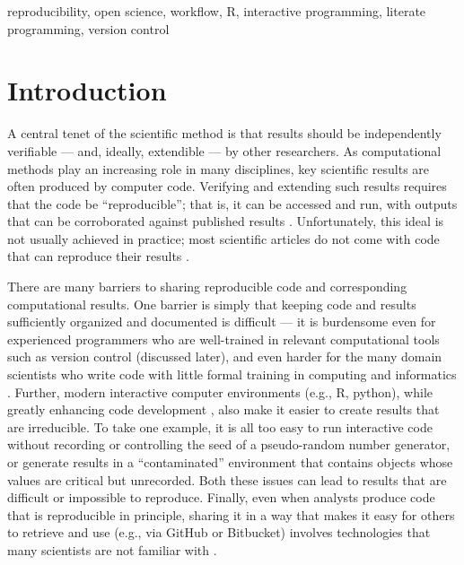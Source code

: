 \documentclass[9pt,a4paper]{extarticle}
\begin{document}
reproducibility, open science, workflow, R, interactive programming,
literate programming, version control

\clearpage

\pagestyle{main}


\section*{Introduction}

A central tenet of the scientific method is that results should be
independently verifiable --- and, ideally, extendible --- by other
researchers. As computational methods play an increasing role in many
disciplines, key scientific results are often produced by computer code.
Verifying and extending such results requires that the code be
``reproducible''; that is, it can be accessed and run, with outputs that
can be corroborated against published results \cite{Buckheit1995,
Gentleman2005, Peng2011, Ince2012, Morin2012, Sandve2013,
Easterbrook2014, Stodden2016, Lowndes2017}. Unfortunately, this ideal is
not usually achieved in practice; most scientific articles do not come
with code that can reproduce their results \cite{Ioannidis2009,
Ioannidis2014, Stodden2018}.

There are many barriers to sharing reproducible code and corresponding
computational results. One barrier is simply that keeping code and
results sufficiently organized and documented is difficult --- it is
burdensome even for experienced programmers who are well-trained in
relevant computational tools such as version control (discussed later),
and even harder for the many domain scientists who write code with
little formal training in computing and informatics \cite{Wilson2014}.
Further, modern interactive computer environments (e.g., R, python),
while greatly enhancing code development \cite{Findler2002}, also make
it easier to create results that are irreducible. To take one example,
it is all too easy to run interactive code without recording or
controlling the seed of a pseudo-random number generator, or generate
results in a ``contaminated'' environment that contains objects whose
values are critical but unrecorded. Both these issues can lead to
results that are difficult or impossible to reproduce. Finally, even
when analysts produce code that is reproducible in principle, sharing it
in a way that makes it easy for others to retrieve and use (e.g., via
GitHub or Bitbucket) involves technologies that many scientists are not
familiar with \cite{Marwick2017, Stodden2018}.
\end{document}
